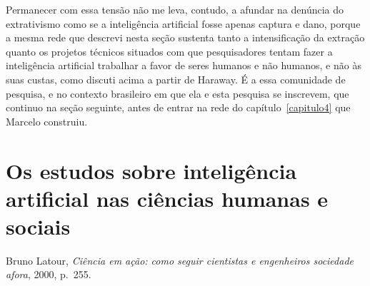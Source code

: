 Permanecer com essa tensão não me leva, contudo, a afundar na denúncia do extrativismo como se a inteligência artificial fosse apenas captura e dano, porque a mesma rede que descrevi nesta seção sustenta tanto a intensificação da extração quanto os projetos técnicos situados com que pesquisadores tentam fazer a inteligência artificial trabalhar a favor de seres humanos e não humanos, e não às suas custas, como discuti acima a partir de Haraway. É a essa comunidade de pesquisa, e no contexto brasileiro em que ela e esta pesquisa se inscrevem, que continuo na seção seguinte, antes de entrar na rede do capítulo~\ref{capitulo4} que Marcelo construiu. 


\section{Os estudos sobre inteligência artificial nas ciências humanas e sociais}
\label{sec:emergencia_campo_brasileiro}

%
{Bruno Latour, \textit{Ciência em ação: como seguir cientistas e engenheiros sociedade afora}, 2000, p.~255.}

